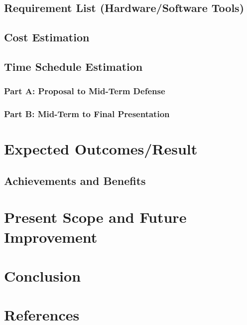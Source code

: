 \documentclass{article}
\begin{document}
\subsection{Requirement List (Hardware/Software Tools)}
\cleardoublepage

\subsection{Cost Estimation}
\cleardoublepage

\subsection{Time Schedule Estimation}
\cleardoublepage
\subsubsection{Part A: Proposal to Mid-Term Defense}
\cleardoublepage
\subsubsection{Part B: Mid-Term to Final Presentation}
\cleardoublepage

\section{Expected Outcomes/Result}
\cleardoublepage
\subsection{Achievements and Benefits}
\cleardoublepage

\section{Present Scope and Future Improvement}
\cleardoublepage

\section{Conclusion}
\cleardoublepage
\section*{References}


\nocite{*}
\end{document}
